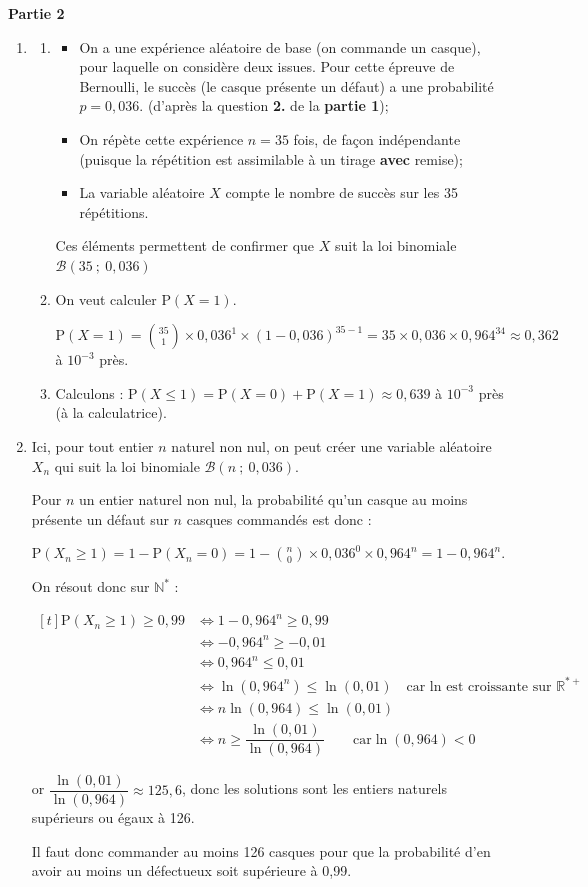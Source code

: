 \documentclass[10pt]{article}
\providecommand{\R}{\mathbb{R}}
\providecommand{\N}{\mathbb{N}}
\begin{document}
\textbf{Partie 2}
\begin{enumerate}
\item 
	\begin{enumerate}
		\item 
		
\begin{itemize}
\item On a une expérience aléatoire de base (on commande un casque), pour laquelle on considère deux issues. Pour cette épreuve de Bernoulli, le succès (le casque présente un défaut) a une probabilité $p = 0,036$. (d'après la question \textbf{2.} de la \textbf{partie 1});
\item On répète cette expérience $n=35$ fois, de façon indépendante (puisque la répétition est assimilable à un tirage \textbf{avec} remise);
\item La variable aléatoire $X$ compte le nombre de succès sur les 35 répétitions.
\end{itemize}

Ces éléments permettent de confirmer que $X$ suit la loi binomiale $ \mathcal{B}(35~;~0,036) $

\item On veut calculer $\mathrm{P}(X = 1)$.

$ \mathrm{P}(X = 1) = \displaystyle \binom{35}{1} \times 0,036^1 \times (1 - 0,036)^{35- 1} = 35 \times 0,036 \times 0,964^{34} \approx 0,362 $ à $ 10^{-3} $ près.

\item Calculons : $\mathrm{P}(X \leqslant 1) = \mathrm{P}(X = 0) + \mathrm{P}(X = 1) \approx 0,639$ à $ 10^{-3} $ près (à la calculatrice).
	\end{enumerate}

	\item Ici, pour tout entier $n$ naturel non nul, on peut créer une variable aléatoire $X_n$ qui suit la loi binomiale $ \mathcal{B}(n~;~0,036) $.

	Pour $n$ un entier naturel non nul, la probabilité qu'un casque au moins présente un défaut sur $n$ casques commandés est donc :

$\mathrm{P}(X_n \geqslant 1) = 1 - \mathrm{P} (X_n = 0) = 1 - \displaystyle \binom{n}{0}\times 0,036^0 \times 0,964^{n} = 1 - 0,964^{n}$.

On résout donc sur $\N^*$ :

$\begin{aligned}[t] \mathrm{P}(X_n \geqslant 1) \geqslant 0,99
&\iff 1 - 0,964^{n} \geqslant 0,99\\
&\iff -0,964^n \geqslant -0,01\\
&\iff 0,964^n \leqslant 0,01\\
&\iff \ln(0,964^n) \leqslant \ln(0,01) \quad \text{car ln est croissante sur }\R^{*+} \\
&\iff n\ln(0,964) \leqslant \ln(0,01)\\
&\iff n \geqslant \dfrac{\ln(0,01)}{\ln(0,964)} \qquad \text{car} \ln(0,964) <0
\end{aligned}$

or $\dfrac{\ln(0,01)}{\ln(0,964)}\approx 125,6$, donc les solutions sont les entiers naturels supérieurs ou égaux à 126.

Il faut donc commander au moins 126 casques pour que la probabilité d'en avoir au moins un défectueux soit supérieure à 0,99.

\end{enumerate}

\bigskip
\end{document}
